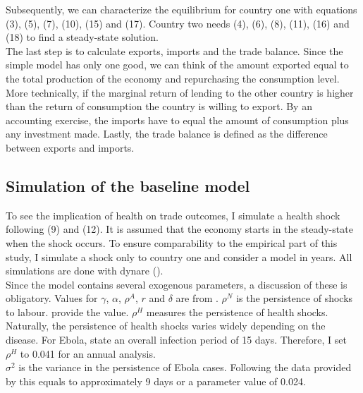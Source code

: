 \documentclass{article}
\begin{document}
Subsequently, we can characterize the equilibrium for country one with equations (3), (5), (7), (10), (15) and (17). Country two needs (4), (6), (8), (11), (16) and (18) to find a steady-state solution. \\
The last step is to calculate exports, imports and the trade balance. Since the simple model has only one good, we can think of the amount exported equal to the total production of the economy and repurchasing the consumption level. More technically, if the marginal return of lending to the other country is higher than the return of consumption the country is willing to export. By an accounting exercise, the imports have to equal the amount of consumption plus any investment made. Lastly, the trade balance is defined as the difference between exports and imports.

\subsection{Simulation of the baseline model}
To see the implication of health on trade outcomes, I simulate a health shock following (9) and (12). It is assumed that the economy starts in the steady-state when the shock occurs. To ensure comparability to the empirical part of this study, I simulate a shock only to country one and consider a model in years. All simulations are done with dynare (\cite{adjemian2011dynare}).\\
Since the model contains several exogenous parameters, a discussion of these is obligatory. Values for $\gamma$, $\alpha$, $\rho^{A}$, $r$ and $\delta$ are from \cite{schmitt2003closing}. $\rho^N$ is the persistence of shocks to labour. \cite{smets2007shocks} provide the value. $\rho^H$ measures the persistence of health shocks. Naturally, the persistence of health shocks varies widely depending on the disease. For Ebola, \cite{fisman2014early} state an overall infection period of 15 days. Therefore, I set $\rho^H$ to 0.041 for an annual analysis.\\
$\sigma^{2}$ is the variance in the persistence of Ebola cases. Following the data provided by \cite{fisman2014early} this equals to approximately 9 days or a parameter value of 0.024.
\end{document}
